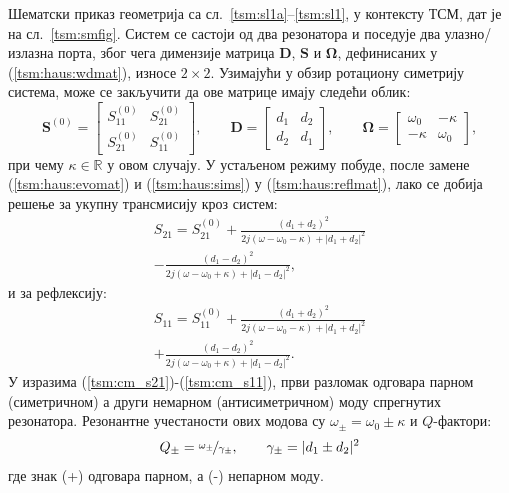 \documentclass[main.tex]{subfiles}
\begin{document}
Шематски приказ геометрија са сл.~\ref{tsm:sl1a}--\ref{tsm:sl1}, у контексту ТСМ, дат је на сл.~\ref{tsm:smfig}. Систем се састоји од два резонатора и поседује два улазно/излазна порта, због чега димензије матрица $\mathbf{D}$, $\mathbf{S}$ и $\mathbf{\Omega}$, дефинисаних у (\ref{tsm:haus:wdmat}), износе $2\times 2$. Узимајући у обзир ротациону симетрију система, може се закључити да ове матрице имају следећи облик:
\begin{equation}
\mathbf{S}^{(0)} = \begin{bmatrix}
S^{(0)}_{11} & S^{(0)}_{21} \\
S^{(0)}_{21} & S^{(0)}_{11}
\end{bmatrix},\qquad
\mathbf{D} = \begin{bmatrix}
d_1 & d_2 \\
d_2 & d_1
\end{bmatrix},\qquad
\mathbf{\Omega} = \begin{bmatrix}
\omega_0 & -\kappa \\
-\kappa & \omega_0
\end{bmatrix},
\label{tsm:haus:sims}\end{equation}
при чему $\kappa\in \mathbb{R}$ у овом случају. У устаљеном режиму побуде, после замене (\ref{tsm:haus:evomat}) и (\ref{tsm:haus:sims}) у (\ref{tsm:haus:reflmat}), лако се добија решење за укупну трансмисију кроз систем:
\begin{equation}
\begin{split}
S_{21} = S^{(0)}_{21} + \frac{(d_1+d_2)^2}{2j(\omega-\omega_0 - \kappa) + |d_1+d_2|^2}\\
- \frac{(d_1-d_2)^2}{2j(\omega-\omega_0 + \kappa) + |d_1-d_2|^2},
\end{split}\label{tsm:cm_s21}
\end{equation}
и за рефлексију:
\begin{equation}
\begin{split}
S_{11} = S^{(0)}_{11} + \frac{(d_1+d_2)^2}{2j(\omega-\omega_0 - \kappa) + |d_1+d_2|^2}\\
+ \frac{(d_1-d_2)^2}{2j(\omega-\omega_0 + \kappa) + |d_1-d_2|^2}.
\end{split}\label{tsm:cm_s11}
\end{equation}
У изразима (\ref{tsm:cm_s21})-(\ref{tsm:cm_s11}), први разломак одговара парном (симетричном) а други немарном (антисиметричном) моду спрегнутих резонатора. Резонантне учестаности ових модова су $\omega_{\pm} = \omega_0 \pm \kappa$ и $Q$-фактори:
\begin{equation}
Q_\pm = \nicefrac{\omega_\pm}{\gamma_{\pm}},\qquad \gamma_{\pm} = |d_1 \pm d_2|^2
\end{equation}
где знак (+) одговара парном, а (-) непарном моду.
% 
% 
\end{document}
